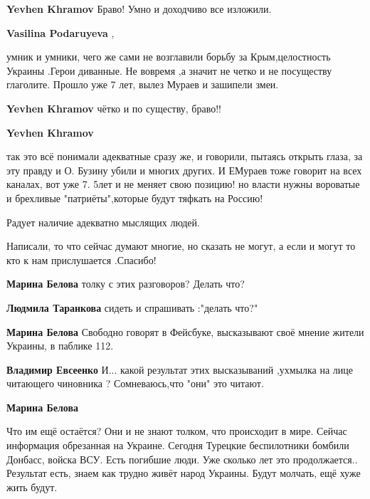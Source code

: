 \begin{itemize}
\begin{itemize} %
\textbf{Yevhen Khramov} Браво! Умно и доходчиво все изложили.

\textbf{Vasilina Podaruyeva} ,

умник и умники, чего же сами не возглавили борьбу за Крым,целостность Украины .Герои диванные.
Не вовремя ,а значит не четко и не посуществу глаголите. Прошло уже 7 лет, вылез Мураев и зашипели змеи.

\textbf{Yevhen Khramov} чётко и по существу, браво!!

\textbf{Yevhen Khramov} 

так это всё понимали адекватные сразу же, и говорили, пытаясь открыть глаза, за
эту правду и О. Бузину убили и многих других. И ЕМураев тоже говорит на всех
каналах, вот уже 7. 5лет и не меняет свою позицию! но власти нужны вороватые и
брехливые "патриёты",которые будут тяфкать на Россию!


Радует наличие адекватно мыслящих людей.
\end{itemize} %


Написали, то что сейчас думают многие, но сказать не могут, а если и могут то кто
к нам прислушается .Спасибо!

\begin{itemize} %
\textbf{Марина Белова} толку с этих разговоров? Делать что?

\textbf{Людмила Таранкова} сидеть и спрашивать :"делать что?"

\textbf{Марина Белова} Свободно говорят в Фейсбуке, высказывают своё мнение жители Украины, в паблике 112.

\textbf{Владимир Евсеенко} И... какой результат этих высказываний ,ухмылка на лице читающего чиновника ? Сомневаюсь,что "они" это читают.

\textbf{Марина Белова} 

Что им ещё остаётся? Они и не знают толком, что происходит в мире. Сейчас
информация обрезанная на Украине. Сегодня Турецкие беспилотники бомбили
Донбасс, войска ВСУ. Есть погибшие люди. Уже сколько лет это
продолжается.. Результат есть, знаем как трудно живёт народ Украины. Будут
молчать, ещё хуже жить будут.


\end{itemize}
\end{itemize}
